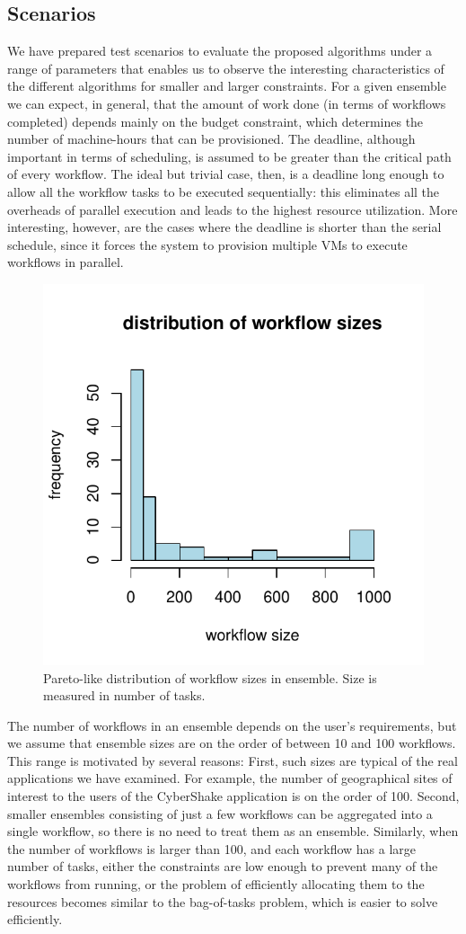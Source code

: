 \documentclass{sig-alternate}
\begin{document}
\subsection{Scenarios}
\label{sec:scenarios}

We have prepared test scenarios to evaluate the proposed algorithms under a 
range of parameters that enables us to observe the interesting characteristics 
of the different algorithms for smaller and larger constraints. For a given 
ensemble we can expect, in general, that the amount of work done (in terms 
of workflows completed) depends mainly on the budget constraint, which 
determines the number of machine-hours that can be provisioned. The deadline, 
although important in terms of scheduling, is assumed to be greater than the 
critical path of every workflow. The ideal but trivial case, then, is a deadline 
long enough to allow all the workflow tasks to be executed sequentially: this 
eliminates all the overheads of parallel execution and leads to the highest 
resource utilization. More interesting, however, are the cases where the deadline 
is shorter than the serial schedule, since it forces the system to provision 
multiple VMs to execute workflows in parallel.

\begin{figure}[tb] 
\centering
\includegraphics[width=0.6\columnwidth]{figures/ensemble-pareto}
\caption{Pareto-like distribution of workflow sizes in ensemble. Size is
measured in number of tasks.}
\label{fig:ensemble-distribution}
\end{figure}

The number of workflows in an ensemble depends on the user's requirements, but
we assume that ensemble sizes are on the order of between 10 and 100 workflows.
This range is motivated by several reasons: First, such sizes are typical of the
real applications we have examined. For example, the number of geographical 
sites of interest to the users of the CyberShake application is on the order 
of 100. Second, smaller ensembles consisting of just a few workflows can be 
aggregated into a single workflow, so there is no need to treat them as an
ensemble. Similarly, when the number of workflows is larger than 100, and each 
workflow has a large number of tasks, either the constraints are low enough to
prevent many of the workflows from running, or the problem of efficiently 
allocating them to the resources becomes similar to the bag-of-tasks problem, 
which is easier to solve efficiently.
\end{document}
